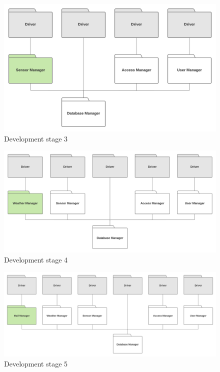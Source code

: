 \documentclass[10pt]{article} %
\begin{document}
\begin{figure}[h!]
    \centering
    \includegraphics[scale=0.45]{images/impl/step3.png}
    \caption{Development stage 3}
    \label{fig:impl3}
\end{figure}
\begin{figure}[h!]
    \centering
    \centerline{\includegraphics[scale=0.45]{images/impl/step4.png}}
    \caption{Development stage 4}
    \label{fig:impl4}
\end{figure}
\newpage
\begin{figure}[h!]
    \centering
    \centerline{\includegraphics[scale=0.4]{images/impl/step5.png}}
    \caption{Development stage 5}
    \label{fig:impl5}
\end{figure}
\end{document}

